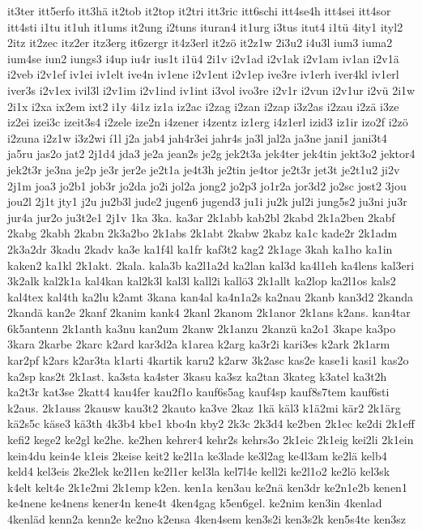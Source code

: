 {it3ter
itt5erfo
itt3hä
it2tob
it2top
it2tri
itt3ric
itt6schi
itt4se4h
itt4sei
itt4sor
itt4sti
i1tu
it1uh
it1ums
it2ung
i2tuns
ituran4
it1urg
i3tus
itut4
i1tü
4ity1
ityl2
2itz
it2zec
itz2er
itz3erg
it6zergr
it4z3erl
it2zö
it2z1w
2i3u2
i4u3l
ium3
iuma2
ium4se
iun2
iungs3
i4up
iu4r
ius1t
i1ü4
2i1v
i2v1ad
i2v1ak
i2v1am
iv1an
i2v1ä
i2veb
i2v1ef
iv1ei
iv1elt
ive4n
iv1ene
i2v1ent
i2v1ep
ive3re
iv1erh
iver4kl
iv1erl
iver3s
i2v1ex
ivil3l
i2v1im
i2v1ind
iv1int
i3vol
ivo3re
i2v1r
i2vun
i2v1ur
i2vü
2i1w
2i1x
i2xa
ix2em
ixt2
i1y
4i1z
iz1a
iz2ac
i2zag
i2zan
i2zap
i3z2as
i2zau
i2zä
i3ze
iz2ei
izei3c
izeit3s4
i2zele
ize2n
i4zener
i4zentz
iz1erg
i4z1erl
izid3
iz1ir
izo2f
i2zö
i2zuna
i2z1w
i3z2wi
í1l
j2a
jab4
jah4r3ei
jahr4s
ja3l
jal2a
ja3ne
jani1
jani3t4
ja5ru
jas2o
jat2
2j1d4
jda3
je2a
jean2s
je2g
jek2t3a
jek4ter
jek4tin
jekt3o2
jektor4
jek2t3r
je3na
je2p
je3r
jer2e
je2t1a
je4t3h
je2tin
je4tor
je2t3r
jet3t
je2t1u2
ji2v
2j1m
joa3
jo2b1
job3r
jo2da
jo2i
jol2a
jong2
jo2p3
jo1r2a
jor3d2
jo2sc
jost2
3jou
jou2l
2j1t
jty1
j2u
ju2b3l
jude2
jugen6
jugend3
ju1i
ju2k
jul2i
jung5s2
ju3ni
ju3r
jur4a
jur2o
ju3t2e1
2j1v
1ka
3ka.
ka3ar
2k1abb
kab2bl
2kabd
2k1a2ben
2kabf
2kabg
2kabh
2kabn
2k3a2bo
2k1abs
2k1abt
2kabw
2kabz
ka1c
kade2r
2k1adm
2k3a2dr
3kadu
2kadv
ka3e
ka1f4l
ka1fr
kaf3t2
kag2
2k1age
3kah
ka1ho
ka1in
kaken2
ka1kl
2k1akt.
2kala.
kala3b
ka2l1a2d
ka2lan
kal3d
ka4l1eh
ka4lens
kal3eri
3k2alk
kal2k1a
kal4kan
kal2k3l
kal3l
kall2i
kallö3
2k1allt
ka2lop
ka2l1os
kals2
kal4tex
kal4th
ka2lu
k2amt
3kana
kan4al
ka4n1a2s
ka2nau
2kanb
kan3d2
2kanda
2kandä
kan2e
2kanf
2kanim
kank4
2kanl
2kanom
2k1anor
2k1ans
k2ans.
kan4tar
6k5antenn
2k1anth
ka3nu
kan2um
2kanw
2k1anzu
2kanzü
ka2o1
3kape
ka3po
3kara
2karbe
2karc
k2ard
kar3d2a
k1area
k2arg
ka3r2i
kari3es
k2ark
2k1arm
kar2pf
k2ars
k2ar3ta
k1arti
4kartik
karu2
k2arw
3k2asc
kas2e
kase1i
kasi1
kas2o
ka2sp
kas2t
2k1ast.
ka3sta
ka4ster
3kasu
ka3sz
ka2tan
3kateg
k3atel
ka3t2h
ka2t3r
kat3se
2katt4
kau4fer
kau2f1o
kauf6s5ag
kauf4sp
kauf8s7tem
kauf6sti
k2aus.
2k1auss
2kausw
kau3t2
2kauto
ka3ve
2kaz
1kä
käl3
k1ä2mi
kär2
2k1ärg
kä2s5c
käse3
kä3th
4k3b4
kbe1
kbo4n
kby2
2k3c
2k3d4
ke2ben
2k1ec
ke2di
2k1eff
kefi2
kege2
ke2gl
ke2he.
ke2hen
kehrer4
kehr2s
kehrs3o
2k1eic
2k1eig
kei2li
2k1ein
kein4du
kein4e
k1eis
2keise
keit2
ke2l1a
ke3lade
ke3l2ag
ke4l3am
ke2lä
kelb4
keld4
kel3eis
2ke2lek
ke2l1en
ke2l1er
kel3la
kel7l4e
kell2i
ke2l1o2
ke2lö
kel3sk
k4elt
kelt4e
2k1e2mi
2k1emp
k2en.
ken1a
ken3au
ke2nä
ken3dr
ke2n1e2b
kenen1
ke4nene
ke4nens
kener4n
kene4t
4ken4gag
k5en6gel.
ke2nim
ken3in
4kenlad
4kenläd
kenn2a
kenn2e
ke2no
k2ensa
4ken4sem
ken3s2i
ken3s2k
ken5s4te
ken3sz
}
